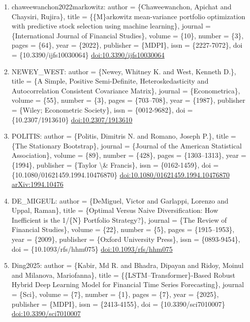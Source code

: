 \documentclass[11pt]{article}
\begin{document}
\begin{enumerate}[leftmargin=*]
  \item chaweewanchon2022markowitz: author = \{Chaweewanchon, Apichat and Chaysiri, Rujira\}, title = \{\{M\}arkowitz mean-variance portfolio optimization with predictive stock selection using machine learning\}, journal = \{International Journal of Financial Studies\}, volume = \{10\}, number = \{3\}, pages = \{64\}, year = \{2022\}, publisher = \{MDPI\}, issn = \{2227-7072\}, doi = \{10.3390/ijfs10030064\} \href{https://doi.org/10.3390/ijfs10030064}{doi:10.3390/ijfs10030064}
  \item NEWEY\_WEST: author = \{Newey, Whitney K. and West, Kenneth D.\}, title = \{A Simple, Positive Semi-Definite, Heteroskedasticity and Autocorrelation Consistent Covariance Matrix\}, journal = \{Econometrica\}, volume = \{55\}, number = \{3\}, pages = \{703--708\}, year = \{1987\}, publisher = \{Wiley; Econometric Society\}, issn = \{0012-9682\}, doi = \{10.2307/1913610\} \href{https://doi.org/10.2307/1913610}{doi:10.2307/1913610}
  \item POLITIS: author = \{Politis, Dimitris N. and Romano, Joseph P.\}, title = \{The Stationary Bootstrap\}, journal = \{Journal of the American Statistical Association\}, volume = \{89\}, number = \{428\}, pages = \{1303--1313\}, year = \{1994\}, publisher = \{Taylor \textbackslash{}\& Francis\}, issn = \{0162-1459\}, doi = \{10.1080/01621459.1994.10476870\} \href{https://doi.org/10.1080/01621459.1994.10476870}{doi:10.1080/01621459.1994.10476870} \href{https://arxiv.org/abs/1994.10476}{arXiv:1994.10476}
  \item DE\_MIGEUL: author = \{DeMiguel, Victor and Garlappi, Lorenzo and Uppal, Raman\}, title = \{Optimal Versus Naive Diversification: How Inefficient is the 1/\{N\} Portfolio Strategy?\}, journal = \{The Review of Financial Studies\}, volume = \{22\}, number = \{5\}, pages = \{1915--1953\}, year = \{2009\}, publisher = \{Oxford University Press\}, issn = \{0893-9454\}, doi = \{10.1093/rfs/hhm075\} \href{https://doi.org/10.1093/rfs/hhm075}{doi:10.1093/rfs/hhm075}
  \item Ding2025: author = \{Kabir, Md R. and Bhadra, Dipayan and Ridoy, Moinul and Milanova, Mariofanna\}, title = \{\{LSTM--Transformer\}-Based Robust Hybrid Deep Learning Model for Financial Time Series Forecasting\}, journal = \{Sci\}, volume = \{7\}, number = \{1\}, pages = \{7\}, year = \{2025\}, publisher = \{MDPI\}, issn = \{2413-4155\}, doi = \{10.3390/sci7010007\} \href{https://doi.org/10.3390/sci7010007}{doi:10.3390/sci7010007}
\end{enumerate}

% 
% 
\end{document}
